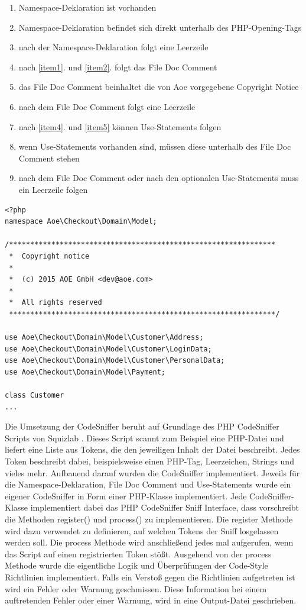 \documentclass[11pt,a4paper]{article} %
\begin{document}
\begin{enumerate}
  \item Namespace-Deklaration ist vorhanden
  \item Namespace-Deklaration befindet sich direkt unterhalb des PHP-Opening-Tags \label{item1}
  \item nach der Namespace-Deklaration folgt eine Leerzeile \label{item2}
  \item nach \ref{item1}. und \ref{item2}. folgt das File Doc Comment
  \item das File Doc Comment beinhaltet die von Aoe vorgegebene Copyright Notice \label{item4}
  \item nach dem File Doc Comment folgt eine Leerzeile \label{item5}
  \item nach \ref{item4}. und \ref{item5} können Use-Statements folgen
  \item wenn Use-Statements vorhanden sind, müssen diese unterhalb des File Doc Comment stehen
  \item nach dem File Doc Comment oder nach den optionalen Use-Statements muss ein Leerzeile folgen
\end{enumerate}

\begin{lstlisting} 
<?php
namespace Aoe\Checkout\Domain\Model;
 
/***************************************************************
 *  Copyright notice
 *
 *  (c) 2015 AOE GmbH <dev@aoe.com>
 *
 *  All rights reserved
 ***************************************************************/
 
use Aoe\Checkout\Domain\Model\Customer\Address;
use Aoe\Checkout\Domain\Model\Customer\LoginData;
use Aoe\Checkout\Domain\Model\Customer\PersonalData;
use Aoe\Checkout\Domain\Model\Payment;
 
class Customer
...
\end{lstlisting} \label{codesniffer}

Die Umsetzung der CodeSniffer beruht auf Grundlage des PHP CodeSniffer Scripts von Squizlab 
\cite{SquizlabPHPCodeSniffer}. Dieses Script scannt zum Beispiel eine PHP-Datei und liefert
eine Liste aus Tokens, die den jeweiligen Inhalt der Datei beschreibt. Jedes Token beschreibt dabei,
beispielsweise einen PHP-Tag, Leerzeichen, Strings und vieles mehr. Aufbauend darauf
wurden die CodeSniffer implementiert. Jeweils für die Namespace-Deklaration, File Doc Comment
und Use-Statements wurde ein eigener CodeSniffer in Form einer PHP-Klasse implementiert.
Jede CodeSniffer-Klasse implementiert dabei das PHP CodeSniffer Sniff Interface, dass vorschreibt
die Methoden register() und process() zu implementieren. Die register Methode wird dazu 
verwendet zu definieren, auf welchen Tokens der Sniff losgelassen werden soll.
Die process Methode wird anschließend jedes mal aufgerufen, wenn das Script auf einen registrierten
Token stößt. Ausgehend von der process Methode wurde die eigentliche Logik und Überprüfungen
der Code-Style Richtlinien implementiert. Falls ein Verstoß gegen die Richtlinien 
aufgetreten ist wird ein Fehler oder Warnung geschmissen.
Diese Information bei einem auftretenden Fehler oder einer Warnung, wird in eine Output-Datei
geschrieben.
\end{document}
